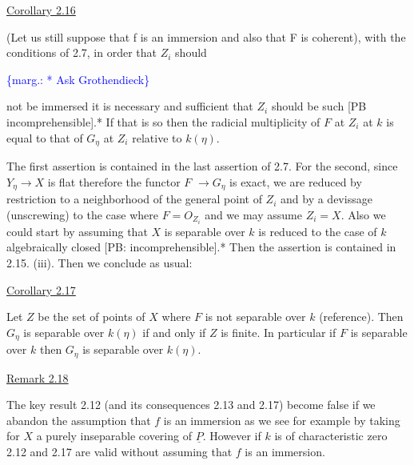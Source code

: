 \documentclass[11pt]{article}
\newcommand{\scanpage}[1]{\par\bigskip\noindent{\small\sffamily[scan #1]}\par}
\newcommand{\mspage}[1]{{\small\sffamily[p.\,#1]}}
\newcommand{\margin}[1]{\textcolor{blue}{\{\textsf{marg.:} #1\}}}
\newcommand{\uline}[1]{\underline{#1}}
\begin{document}
\uline{Corollary 2.16}

(Let us still suppose that f is an immersion and also that F
is coherent), with the conditions of 2.7, in order that $Z_i$ should

\margin{* Ask Grothendieck}

\clearpage
\scanpage{24/18}
\mspage{18}

not be immersed it is necessary and sufficient that $Z_i$ should be
such [PB incomprehensible].* If that is so then the radicial
multiplicity of $F$ at $Z_i$ at $k$ is equal to that of $G_\eta$ at $Z_i$ relative
to $k(\eta)$.

The first assertion is contained in the last assertion of
2.7. For the second, since $Y_\eta \rightarrow X$ is flat therefore the functor $F$
$\rightarrow G_\eta$ is exact, we are reduced by restriction to a neighborhood of
the general point of $Z_i$ and by a devissage (unscrewing) to the case
where $F = O_{Z_i}$ and we may assume $Z_i = X$. Also we could start by
assuming that $X$ is separable over $k$ is reduced to the case of $k$
algebraically closed [PB: incomprehensible].* Then the assertion
is contained in 2.15. (iii). Then we conclude as usual:

\uline{Corollary 2.17}

Let $Z$ be the set of points of $X$ where $F$ is not separable over
$k$ (reference). Then $G_\eta$ is separable over $k(\eta)$ if and only if $Z$ is
finite. In particular if $F$ is separable over $k$ then $G_\eta$ is
separable over $k(\eta)$.

\uline{Remark 2.18}

The key result 2.12 (and its consequences 2.13 and 2.17)
become false if we abandon the assumption that $f$ is an immersion
as we see for example by taking for $X$ a purely inseparable
covering of $\underline{P}$. However if $k$ is of characteristic zero 2.12 and
2.17 are valid without assuming that $f$ is an immersion.

\clearpage
\scanpage{24/19}
\mspage{19}
\end{document}
